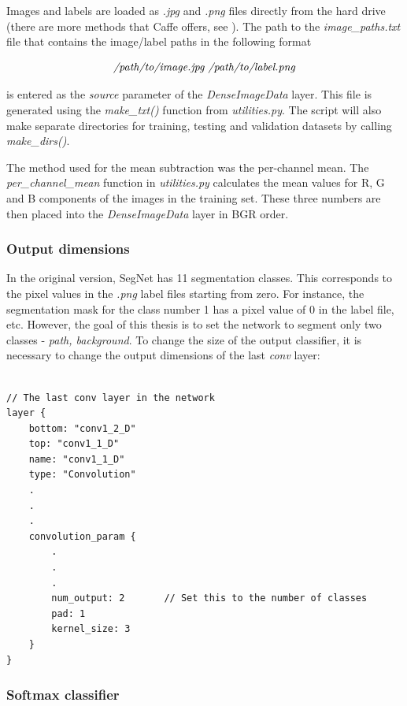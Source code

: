 Images and labels are loaded as \textit{.jpg} and \textit{.png} files directly from the hard drive (there are more methods that Caffe offers, see \cite{caffe}). The path to the \textit{image\_paths.txt} file that contains the image/label paths in the following format

$$
\text{\textit{/path/to/image.jpg /path/to/label.png}}
$$

\noindent is entered as the \textit{source} parameter of the \textit{DenseImageData} layer. This file is generated using the \textit{make\_txt()} function from \textit{utilities.py}. The script will also make separate directories for training, testing and validation datasets by calling \textit{make\_dirs()}.

The method used for the mean subtraction was the per-channel mean. The \textit{per\_channel\_mean} function in \textit{utilities.py} calculates the mean values for R, G and B components of the images in the training set. These three numbers are then placed into the \textit{DenseImageData} layer in BGR order.

\subsubsection{Output dimensions}

In the original version, SegNet has 11 segmentation classes. This corresponds to the pixel values in the \textit{.png} label files starting from zero. For instance, the segmentation mask for the class number 1 has a pixel value of 0 in the label file, etc. However, the goal of this thesis is to set the network to segment only two classes - \textit{path, background}. To change the size of the output classifier, it is necessary to change the output dimensions of the last \textit{conv} layer:

\begin{lstlisting}[caption={Setting number of outputs in \textit{train.prototxt} \cite{filip_github}},captionpos=b]

// The last conv layer in the network
layer {
	bottom: "conv1_2_D"
	top: "conv1_1_D"
	name: "conv1_1_D"
	type: "Convolution"
	.
	.
	.
	convolution_param {
		.
		.
		.
		num_output: 2		// Set this to the number of classes
		pad: 1
		kernel_size: 3
	}
}
\end{lstlisting}

\newpage
\subsubsection{Softmax classifier}

